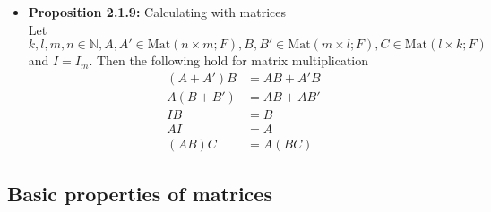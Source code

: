 \documentclass[11pt,a4paper]{article}
\begin{document}
\begin{itemize}
    \item \textbf{Proposition 2.1.9:} Calculating with matrices \\
        Let $k, l, m, n \in \mathbb{N}, A, A' \in \mathrm{Mat}(n \times m;F),
        B, B' \in \mathrm{Mat}(m \times l;F), C \in \mathrm{Mat}(l \times k; F)$ and $I = I_m$.
        Then the following hold for matrix multiplication
        \begin{align*}{}
            (A + A')B & = AB + A'B \\
            A(B + B') & = AB + AB' \\
            IB        & = B \\
            AI        & = A \\
            (AB)C     & = A(BC)
        \end{align*}
\end{itemize}

\subsection{Basic properties of matrices}
\end{document}
